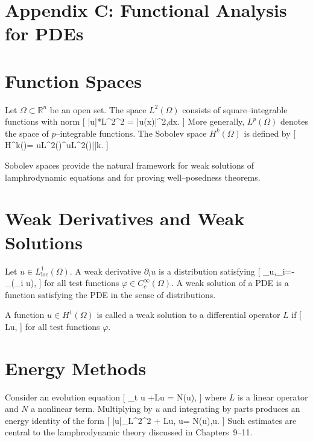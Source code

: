 \section*{Appendix C: Functional Analysis for PDEs}

\section{Function Spaces}

Let $\Omega\subset\mathbb{R}^n$ be an open set. The space $L^2(\Omega)$ consists of square--integrable functions with norm
[
|u|*{L^2}^2 = \int*\Omega |u(x)|^2,dx.
]
More generally, $L^p(\Omega)$ denotes the space of $p$--integrable functions.  The Sobolev space $H^k(\Omega)$ is defined by
[
H^k(\Omega)={ u\in L^2(\Omega)\mid \partial^\alpha u\in L^2(\Omega)|\alpha|\le k}.
]

\begin{remark}
Sobolev spaces provide the natural framework for weak solutions of lamphrodynamic equations and for proving well--posedness theorems.
\end{remark}

\section{Weak Derivatives and Weak Solutions}

Let $u\in L^1_{\mathrm{loc}}(\Omega)$. A weak derivative $\partial_i u$ is a distribution satisfying
[
\int_\Omega u,\partial_i\varphi=-\int_\Omega (\partial_i u),\varphi
]
for all test functions $\varphi\in C_c^\infty(\Omega)$. A weak solution of a PDE is a function satisfying the PDE in the sense of distributions.

\begin{definition}
A function $u\in H^1(\Omega)$ is called a weak solution to a differential operator $L$ if
[
\langle Lu,\varphi{}
]
for all test functions $\varphi$.
\end{definition}

\section{Energy Methods}

Consider an evolution equation
[
\partial_t u +Lu = N(u),
]
where $L$ is a linear operator and $N$ a nonlinear term. Multiplying by $u$ and integrating by parts produces an energy identity of the form
[
|u|_{L^2}^2 + \langle Lu, u\rangle = \langle N(u),u\rangle.
]
Such estimates are central to the lamphrodynamic theory discussed in Chapters~9--11.

